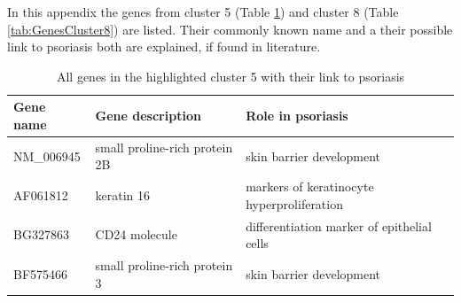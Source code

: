 \documentclass[10pt,a4paper]{article}
\begin{document}
In this appendix the genes from cluster 5 (Table \ref{tab:GenesCluster5}) and cluster 8 (Table \ref{tab:GenesCluster8}) are listed. Their commonly known name and a their possible link to psoriasis both are explained, if found in literature.

\begin{table}[]
	\centering
	\caption{All genes in the highlighted cluster 5 with their link to psoriasis}
	\label{tab:GenesCluster5}
	\begin{tabular}{l|p{4.5cm} p{8.5cm}}
		\textbf{Gene name} & \textbf{Gene description}                                                                                               & \textbf{Role in psoriasis}                                                                                                                                                                                                                \\ \hline
		NM\_006945         & small proline-rich protein 2B                                                                                           & skin barrier development\cite{roberson2010psoriasis}                                                                                                                                                                                                                  \\
		AF061812           & keratin 16                                                                                                              & markers of keratinocyte hyperproliferation\cite{leigh1995keratins}                                                                                                                                                                                                \\
		BG327863           & CD24 molecule                                                                                                           & differentiation marker of epithelial cells\cite{vegfors2012expression}                                                                                                                                                                                                \\
		BF575466           & small proline-rich protein 3                                                                                            & skin barrier development\cite{kainu2009association}                                                                                                                                                                                                                  \\

\end{tabular}
\end{table}
\end{document}
